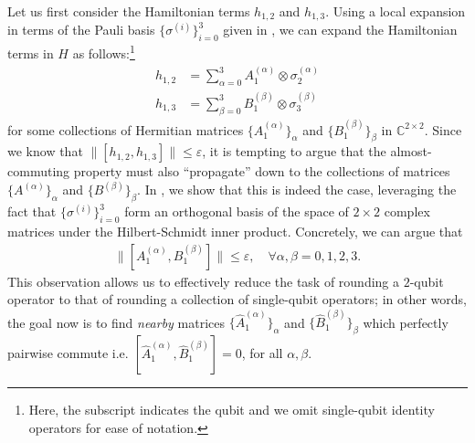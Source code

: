 \documentclass[11pt]{article}
\theoremstyle{plain}
\newcommand{\eps}{\varepsilon}
\begin{document}
Let us first consider the Hamiltonian terms $h_{1,2}$ and $h_{1,3}$. 
Using a local expansion in terms of the Pauli basis $\{\sigma^{(i)}\}_{i=0}^3$ given in , we can expand the Hamiltonian terms in $H$ as follows:\footnote{Here, the subscript indicates the qubit and we omit single-qubit identity operators for ease of notation.}
\begin{align}
h_{1,2} &= \sum_{\alpha=0}^3 A^{(\alpha)}_1 \otimes \sigma_2^{(\alpha)}  \label{eq:pauli-decomp-h12}\\
h_{1,3} &= \sum_{\beta=0}^3 B^{(\beta)}_1 \otimes \sigma_3^{(\beta)}  \label{eq:pauli-decomp-h13} 
\end{align}
for some collections of Hermitian matrices $\{A_1^{(\alpha)}\}_\alpha$ and $\{B_1^{(\beta)}\}_\beta$ in $\mathbb{C}^{2 \times 2}$.
Since we know that $\|[h_{1,2},h_{1,3}]\| \leq \eps$, it is tempting to argue that the almost-commuting property must also ``propagate'' down to the collections of matrices $\{A^{(\alpha)}\}_\alpha$ and $\{B^{(\beta)}\}_\beta$. In , we show that this is indeed the case, leveraging the fact that $\{\sigma^{(i)}\}_{i=0}^3$ form an orthogonal basis of the space of $2\times 2$ complex matrices under the Hilbert-Schmidt inner product. Concretely, we can argue that
\begin{align}\label{eq:almost-commuting-A-B}
\|[A_1^{(\alpha)}, B_1^{(\beta)}]\| \leq \eps, \quad \forall 
\alpha,\beta=0,1,2,3.
\end{align}
This observation allows us to effectively reduce the task of rounding a $2$-qubit operator to that of rounding a collection of single-qubit operators; in other words, the goal now is to find \emph{nearby} matrices $\{\hat A_1^{(\alpha)}\}_\alpha$ and $\{\hat B_1^{(\beta)}\}_\beta$ which perfectly pairwise commute i.e. $[\hat A_1^{(\alpha)}, \hat B_1^{(\beta)}]=0$, for all $\alpha,\beta$. 
\end{document}

